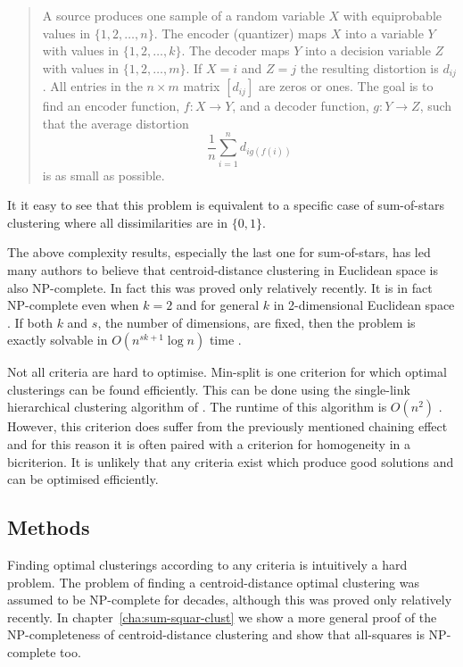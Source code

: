 \documentclass[a4paper]{report}
\begin{document}
\begin{quote}
  A source produces one sample of a random variable $X$ with equiprobable
  values in $\{1,2,\dotsc,n\}$.  The encoder (quantizer) maps $X$ into a
  variable $Y$ with values in $\{1,2,\dotsc,k\}$. The decoder maps $Y$ into a
  decision variable $Z$ with values in $\{1,2,\dotsc,m\}$. If $X = i$ and $Z =
  j$ the resulting distortion is $d_{ij}$.  All entries in the $n \times m$
  matrix $[d_{ij}]$ are zeros or ones. The goal is to find an encoder
  function, $f \colon X \to Y$, and a decoder function, $g \colon Y \to Z$,
  such that the average distortion
  \begin{equation*}
    \frac{1}{n} \sum_{i=1}^{n} d_{ig(f(i))}
  \end{equation*}
  is as small as possible.
\end{quote}

It it easy to see that this problem is equivalent to a specific case of
sum-of-stars clustering where all dissimilarities are in $\{0,1\}$.

The above complexity results, especially the last one for sum-of-stars, has
led many authors to believe that centroid-distance clustering in Euclidean
space is also NP-complete.  In fact this was proved only relatively recently.
It is in fact NP-complete even when $k=2$ \citep{aloise09exact} and for
general $k$ in 2-dimensional Euclidean space \citep{mahajan09}.  If both $k$
and $s$, the number of dimensions, are fixed, then the problem is exactly
solvable in $O(n^{sk+1} \log n)$ time \citep{inaba94weightedvoronoi}.

Not all criteria are hard to optimise.  Min-split is one criterion for which
optimal clusterings can be found efficiently.  This can be done using the
single-link hierarchical clustering algorithm of
\citet{johnson67hierarchical}.  The runtime of this algorithm is $O(n^2)$
\citep{delattre1980bicriterion}.  However, this criterion does suffer from the
previously mentioned chaining effect and for this reason it is often paired
with a criterion for homogeneity in a bicriterion.  It is unlikely that any
criteria exist which produce good solutions and can be optimised efficiently.

\subsection{Methods}
\label{sec:methods}

Finding optimal clusterings according to any criteria is intuitively a hard
problem.  The problem of finding a centroid-distance optimal clustering was
assumed to be NP-complete for decades, although this was proved only
relatively recently\citep{aloise09exact}.  In
chapter~\ref{cha:sum-squar-clust} we show a more general proof of the
NP-completeness of centroid-distance clustering and show that all-squares is
NP-complete too.
\end{document}
